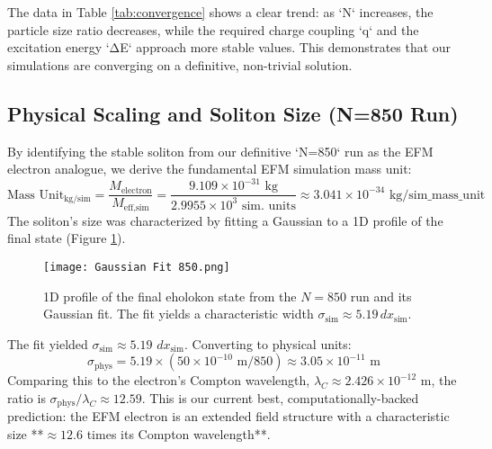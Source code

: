 \documentclass[11pt]{article}
\begin{document}
The data in Table \ref{tab:convergence} shows a clear trend: as `N` increases, the particle size ratio decreases, while the required charge coupling `q` and the excitation energy `ΔE` approach more stable values. This demonstrates that our simulations are converging on a definitive, non-trivial solution.

\subsection{Physical Scaling and Soliton Size (N=850 Run)}
By identifying the stable soliton from our definitive `N=850` run as the EFM electron analogue, we derive the fundamental EFM simulation mass unit:
\[
\text{Mass Unit}_{\text{kg/sim}} = \frac{M_{\text{electron}}}{M_{\text{eff,sim}}} = \frac{9.109 \times 10^{-31} \text{ kg}}{2.9955 \times 10^3 \text{ sim. units}} \approx 3.041 \times 10^{-34} \text{ kg/sim\_mass\_unit}
\]
The soliton's size was characterized by fitting a Gaussian to a 1D profile of the final state (Figure \ref{fig:ehokolon_profile_fit}).
\begin{figure}[htbp]
    \centering
    \texttt{[image: Gaussian Fit 850.png]}
    \caption{1D profile of the final eholokon state from the \(N=850\) run and its Gaussian fit. The fit yields a characteristic width \(\sigma_{\text{sim}} \approx 5.19 \, dx_{\text{sim}}\).}
    \label{fig:ehokolon_profile_fit}
\end{figure}
The fit yielded \(\sigma_{\text{sim}} \approx 5.19\) \(dx_{\text{sim}}\). Converting to physical units:
\[
\sigma_{\text{phys}} = 5.19 \times (50 \times 10^{-10} \text{ m} / 850) \approx 3.05 \times 10^{-11} \text{ m}
\]
Comparing this to the electron's Compton wavelength, \(\lambda_C \approx 2.426 \times 10^{-12}\) m, the ratio is \(\sigma_{\text{phys}} / \lambda_C \approx 12.59\). This is our current best, computationally-backed prediction: the EFM electron is an extended field structure with a characteristic size **\(\approx 12.6\) times its Compton wavelength**.
\end{document}
